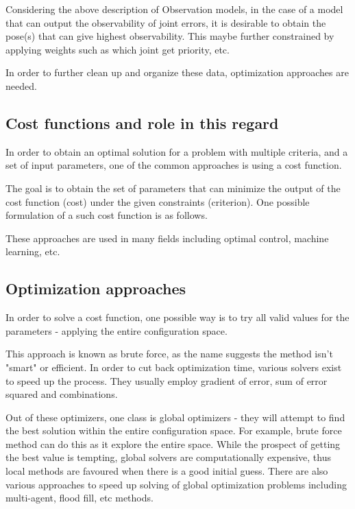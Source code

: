 \documentclass[english, printversion, nomenclature, notitle]{tuvisionthesis} %
\begin{document}
Considering the above description of Observation models, in the case of a model that can output the observability of joint errors, it is desirable to obtain the pose(s) that can give highest observability. This maybe further constrained by applying weights such as which joint get priority, etc.

In order to further clean up and organize these data, optimization approaches are needed.

\subsection{Cost functions and role in this regard}

In order to obtain an optimal solution for a problem with multiple criteria, and a set of input parameters, one of the common approaches is using a cost function.

The goal is to obtain the set of parameters that can minimize the output of the cost function (cost) under the given constraints (criterion). One possible formulation of a such cost function is as follows.


These approaches are used in many fields including optimal control, machine learning, etc.

\subsection{Optimization approaches}

In order to solve a cost function, one possible way is to try all valid values for the parameters - applying the entire configuration space.

This approach is known as brute force, as the name suggests the method isn't "smart" or efficient. In order to cut back optimization time, various solvers exist to speed up the process. They usually employ gradient of error, sum of error squared and combinations.

Out of these optimizers, one class is global optimizers - they will attempt to find the best solution within the entire configuration space. For example, brute force method can do this as it explore the entire space. While the prospect of getting the best value is tempting, global solvers are computationally expensive, thus local methods are favoured when there is a good initial guess. There are also various approaches to speed up solving of global optimization problems including multi-agent, flood fill, etc methods. 
\end{document}
